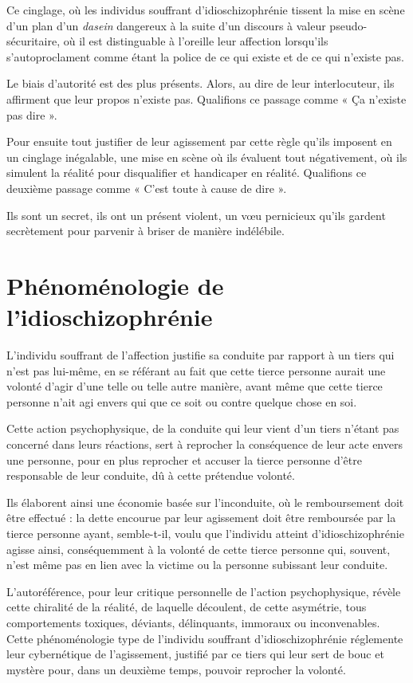 \documentclass[12pt,oneside]{article}
\begin{document}
Ce cinglage, où les individus souffrant d'idioschizophrénie tissent la mise en scène d'un plan d'un \emph{dasein} dangereux à la suite d'un discours à valeur pseudo-sécuritaire, où il est distinguable à l'oreille leur affection lorsqu'ils s'autoproclament comme étant la police de ce qui existe et de ce qui n'existe pas.

Le biais d'autorité est des plus présents. Alors, au dire de leur interlocuteur, ils affirment que leur propos n'existe pas. Qualifions ce passage comme « Ça n'existe pas dire ».

Pour ensuite tout justifier de leur agissement par cette règle qu'ils imposent en un cinglage inégalable, une mise en scène où ils évaluent tout négativement, où ils simulent la réalité pour disqualifier et handicaper en réalité. Qualifions ce deuxième passage comme « C'est toute à cause de dire ».

Ils sont un secret, ils ont un présent violent, un vœu pernicieux qu'ils gardent secrètement pour parvenir à briser de manière indélébile.


\section{Phénoménologie de l'idioschizophrénie}

L'individu souffrant de l'affection justifie sa conduite par rapport à un tiers qui n'est pas lui-même, en se référant au fait que cette tierce personne aurait une volonté d'agir d'une telle ou telle autre manière, avant même que cette tierce personne n'ait agi envers qui que ce soit ou contre quelque chose en soi.

Cette action psychophysique, de la conduite qui leur vient d'un tiers n'étant pas concerné dans leurs réactions, sert à reprocher la conséquence de leur acte envers une personne, pour en plus reprocher et accuser la tierce personne d'être responsable de leur conduite, dû à cette prétendue volonté.

Ils élaborent ainsi une économie basée sur l'inconduite, où le remboursement doit être effectué : la dette encourue par leur agissement doit être remboursée par la tierce personne ayant, semble-t-il, voulu que l'individu atteint d'idioschizophrénie agisse ainsi, conséquemment à la volonté de cette tierce personne qui, souvent, n'est même pas en lien avec la victime ou la personne subissant leur conduite.

L'autoréférence, pour leur critique personnelle de l'action psychophysique, révèle cette chiralité de la réalité, de laquelle découlent, de cette asymétrie, tous comportements toxiques, déviants, délinquants, immoraux ou inconvenables. Cette phénoménologie type de l'individu souffrant d'idioschizophrénie réglemente leur cybernétique de l'agissement, justifié par ce tiers qui leur sert de bouc et mystère pour, dans un deuxième temps, pouvoir reprocher la volonté.
\end{document}
